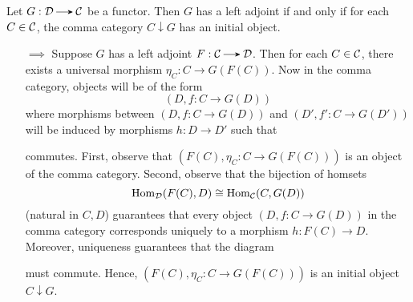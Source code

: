     \begin{proposition}
        Let $G: \dd \to \cc$ be a functor. Then $G$ has a left adjoint 
        if and only if for each $C \in \mathcal{C}$, the comma category $C \downarrow G$ 
        has an initial object.
    \end{proposition}

    \begin{prf}
        \begin{itemize}
            \item[$\bm{\implies}$]
            Suppose $G$ has a left adjoint $F: \cc \to \dd$. Then 
            for each $C \in \mathcal{C}$, there exists a universal morphism 
            $\eta_C: C \to G(F(C))$. 
            Now in the comma category, objects will be of 
            the form 
            \[
                (D, f: C \to G(D))
            \]
            where morphisms between $(D, f: C \to G(D))$ and $(D', f': C \to G(D'))$ 
            will be induced by morphisms $h: D \to D'$ such that 
            \begin{center}
            \end{center}
            commutes. First, observe that $(F(C), \eta_C: C \to G(F(C)))$ 
            is an object of the comma category. Second, observe that the 
            bijection of homsets 
            \[
                \operatorname{\mathrm{Hom}}_{\mathcal{D}}(F(C), D) \cong \operatorname{\mathrm{Hom}}_{\mathcal{C}}(C, G(D))   
            \]
            (natural in $C, D$) 
            guarantees that every object
            $(D, f: C \to G(D))$ in the comma category corresponds uniquely to
            a morphism $h: F(C) \to D$. Moreover, uniqueness guarantees that the diagram 
            \begin{center}
            \end{center}
            must commute. Hence, $(F(C), \eta_C: C \to G(F(C)) )$ is an 
            initial object $C \downarrow G$. 


\end{itemize}
\end{prf}
